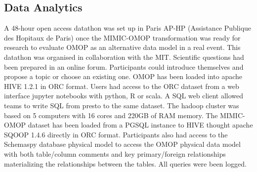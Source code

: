 %
%
\subsection{Data Analytics}

A 48-hour open access datathon \cite{mimic-omop-datathon} was set up in Paris AP-HP 
(Assistance Publique des Hopitaux de Paris) once the MIMIC-OMOP transformation was 
ready for research to evaluate OMOP as an alternative data model in a real event. 
This datathon was organised in collaboration with the MIT.
Scientific questions had been prepared in an online forum. Participants could 
introduce themselves and propose a topic or choose an existing one. 
OMOP has been loaded into apache HIVE 1.2.1 in ORC format. Users had access to 
the ORC dataset from a web interface jupyter notebooks with python, R or scala. 
A SQL web client allowed teams to write SQL from presto to the same dataset. 
The hadoop cluster was based on 5 computers with 16 cores and 220GB of RAM memory. 
The MIMIC-OMOP dataset has been loaded from a PGSQL instance to HIVE thought apache 
SQOOP 1.4.6 directly in ORC format. Participants also had access to the Schemaspy 
database physical model to access the OMOP physical data model with both 
table/column comments and key primary/foreign relationships materializing the 
relationships between the tables. All queries were been logged.

